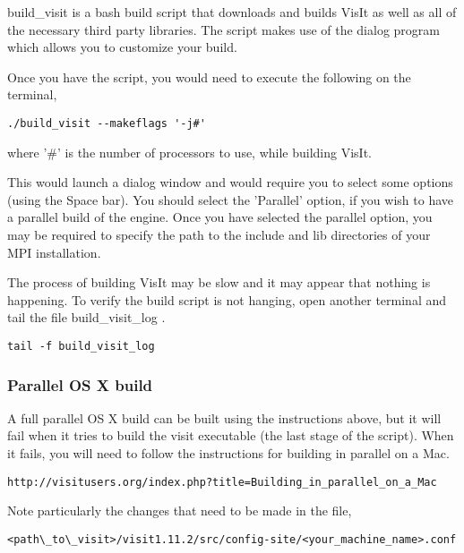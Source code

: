 build\_visit is a bash build script that downloads and builds VisIt as well as all of the necessary third party libraries. The script makes use of the dialog program which allows you to customize your build.

Once you have the script, you would need to execute the following on the terminal,

\begin{Verbatim}[fontsize=\footnotesize]
./build_visit --makeflags '-j#'
\end{Verbatim}
	
\normalfont where '\#' is the number of processors to use, while building VisIt. 

This would launch a dialog window and would require you to select some options (using the Space bar). You should select the 'Parallel' option, if you wish to have a parallel build of the engine. Once you have selected the parallel option, you may be required to specify the path to the include and lib directories of your MPI installation. 

The process of building VisIt may be slow and it may appear that nothing is happening. To verify the build script is not hanging, open another terminal and tail the file build\_visit\_log	. 

\begin{Verbatim}[fontsize=\footnotesize]
tail -f build_visit_log
\end{Verbatim}

\normalfont  
\subsubsection{Parallel OS X build}
\label{sec:ParallelOSXBuild}

A full parallel OS X build can be built using the instructions above, but it will fail when it tries to build the visit executable (the last stage of the script). When it fails, you will need to follow the instructions for building in parallel on a Mac. 

\begin{Verbatim}[fontsize=\footnotesize]
http://visitusers.org/index.php?title=Building_in_parallel_on_a_Mac
\end{Verbatim}
  
Note particularly the changes that need to be made in the file, 

\begin{Verbatim}[fontsize=\footnotesize]
<path\_to\_visit>/visit1.11.2/src/config-site/<your_machine_name>.conf
\end{Verbatim}

